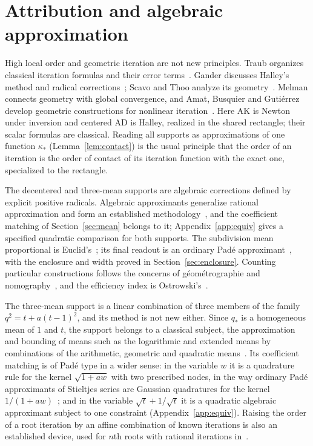 \section{Attribution and algebraic approximation}\label{sec:attribution}

High local order and geometric iteration are not new principles. Traub organizes classical iteration
formulas and their error terms~\cite{traub61,traub64}. Gander discusses Halley's method and radical
corrections~\cite{gander}; Scavo and Thoo analyze its geometry~\cite{scavo}. Melman connects geometry
with global convergence, and Amat, Busquier and Guti\'errez develop geometric constructions for
nonlinear iteration~\cite{melman,amat}. Here AK is Newton under inversion and centered AD is Halley,
realized in the shared rectangle; their scalar formulas are classical. Reading all supports as
approximations of one function $\kappa_*$ (Lemma~\ref{lem:contact}) is the usual principle that the
order of an iteration is the order of contact of its iteration function with the exact one, specialized
to the rectangle.

The decentered and three-mean supports are algebraic corrections defined by explicit positive
radicals. Algebraic approximants generalize rational approximation and form an established
methodology~\cite{sergeev,shafer}, and the coefficient matching of Section~\ref{sec:mean} belongs to it;
Appendix~\ref{app:equiv} gives a specified quadratic comparison for both supports. The subdivision mean
proportional is Euclid's~\cite{euclid}; its final readout is an ordinary Pad\'e
approximant~\cite{dlmf,baker}, with the enclosure and width proved in Section~\ref{sec:enclosure}.
Counting particular constructions follows the concerns of g\'eom\'etrographie and
nomography~\cite{lemoine,ocagne}, and the efficiency index is Ostrowski's~\cite{ostrowski}.

The three-mean support is a linear combination of three members of the family
$q^{2}=t+a(t-1)^{2}$, and its method is not new either. Since $q_*$ is a homogeneous mean of $1$ and
$t$, the support belongs to a classical subject, the approximation and bounding of means such as the
logarithmic and extended means by combinations of the arithmetic, geometric and quadratic
means~\cite{carlson,stolarsky}. Its coefficient matching is of Pad\'e type in a wider sense: in the
variable $w$ it is a quadrature rule for the kernel $\sqrt{1+aw}$ with two prescribed nodes, in the way
ordinary Pad\'e approximants of Stieltjes series are Gaussian quadratures for the kernel
$1/(1+aw)$~\cite{baker}; and in the variable $\sqrt t+1/\sqrt t$ it is a quadratic algebraic approximant
subject to one constraint (Appendix~\ref{app:equiv}). Raising the order of a root iteration by an affine
combination of known iterations is also an established device, used for $n$th roots with rational
iterations in~\cite{dubeau}.

